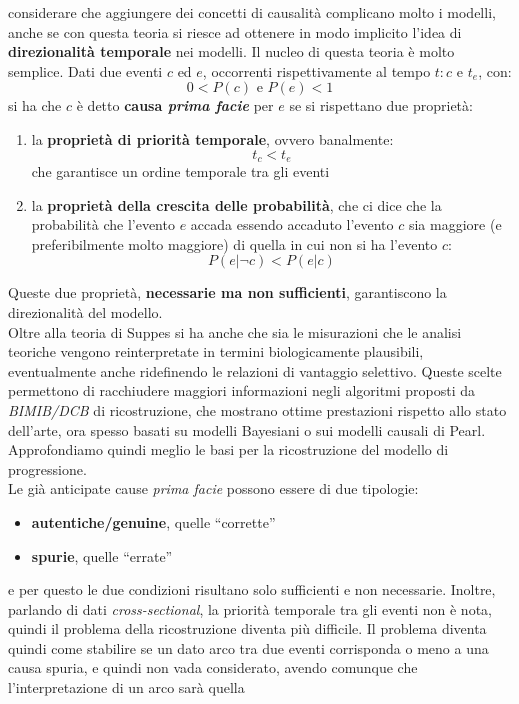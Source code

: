 \documentclass[a4paper,12pt, oneside]{book}
\begin{document}
considerare che aggiungere dei concetti di causalità complicano molto i modelli,
anche se con questa teoria si riesce ad ottenere in modo implicito l'idea di
\textbf{direzionalità temporale} nei modelli. Il nucleo di questa teoria è molto
semplice. Dati due eventi $c$ ed $e$, occorrenti rispettivamente al tempo $t:c$
e $t_e$, con:
\[0<P(c)\mbox{ e } P(e)<1\]
si ha che $c$ è detto \textbf{causa \textit{prima facie}} per $e$ se si
rispettano due proprietà:
\begin{enumerate}
  \item la \textbf{proprietà di priorità temporale}, ovvero banalmente:
  \[t_c<t_e\]
  che garantisce un ordine temporale tra gli eventi
  \item la \textbf{proprietà della crescita delle probabilità}, che ci dice che
  la probabilità che l'evento $e$ accada essendo accaduto l'evento $c$ sia
  maggiore (e preferibilmente molto maggiore) di quella in cui non si ha
  l'evento $c$:
  \[P(e | \neg c) < P(e | c)\]
\end{enumerate}
Queste due proprietà, \textbf{necessarie ma non sufficienti}, garantiscono la
direzionalità del modello.\\
Oltre alla teoria di Suppes si ha anche che sia le misurazioni che le analisi
teoriche vengono reinterpretate in termini biologicamente plausibili,
eventualmente anche ridefinendo le  relazioni di vantaggio selettivo. Queste
scelte permettono di racchiudere maggiori informazioni negli algoritmi proposti
da \textit{BIMIB/DCB} di ricostruzione, che mostrano ottime prestazioni rispetto
allo stato dell'arte, ora spesso basati su modelli Bayesiani o sui modelli
causali di Pearl.\\
Approfondiamo quindi meglio le basi per la ricostruzione del modello di
progressione.\\
Le già anticipate cause \textit{prima facie} possono essere di due tipologie:
\begin{itemize}
  \item \textbf{autentiche/genuine}, quelle ``corrette''
  \item \textbf{spurie}, quelle ``errate''
\end{itemize}
e per questo le due condizioni risultano solo sufficienti e non
necessarie. Inoltre, parlando di dati \textit{cross-sectional},  la priorità
temporale tra gli eventi non è nota, quindi il problema della ricostruzione
diventa più difficile. Il problema diventa quindi come stabilire se un dato
arco tra due eventi corrisponda o meno a una causa spuria, e quindi non
vada considerato, avendo comunque che l'interpretazione di un arco sarà quella
\end{document}
